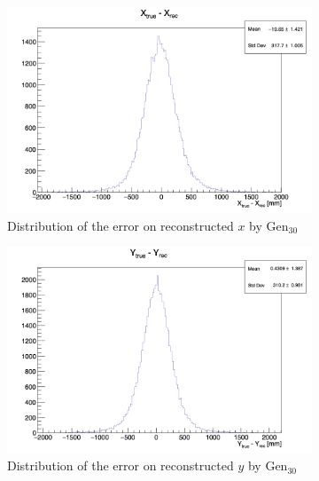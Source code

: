 \documentclass[../main.tex]{subfiles}
\begin{document}
\begin{figure}[ht]
  \centering
  \begin{subfigure}[t]{0.32\linewidth}
    \centering
    \includegraphics[width=\linewidth]{images/jcnn/vic_cnn/cnn_delta_x.png}
    \caption{Distribution of the error on reconstructed $x$ by $\mathrm{Gen}_{30}$}
    \label{fig:jcnn:vic_cnn:cnn_delta_x}
  \end{subfigure}
  \begin{subfigure}[t]{0.32\linewidth}
    \centering
    \includegraphics[width=\linewidth]{images/jcnn/vic_cnn/cnn_delta_y.png}
    \caption{Distribution of the error on reconstructed $y$ by $\mathrm{Gen}_{30}$}
    \label{fig:jcnn:vic_cnn:cnn_delta_y}
  \end{subfigure}
  \begin{subfigure}[t]{0.32\linewidth}
    \centering

\end{subfigure}
\end{figure}
\end{document}
